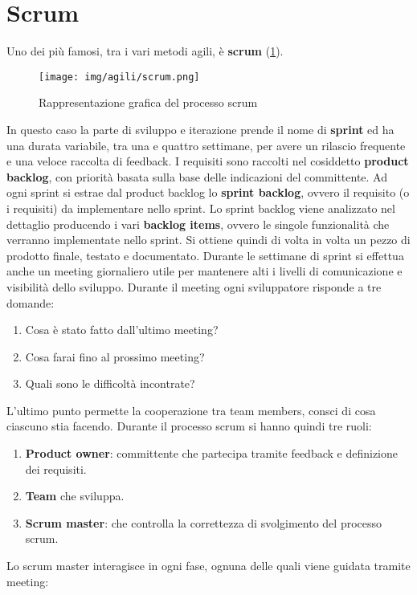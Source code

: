 \section{Scrum}
Uno dei più famosi, tra i vari metodi agili, è \textbf{scrum} (\ref{fig:scrum}).
\begin{figure}[!ht]
      \centering
      \texttt{[image: img/agili/scrum.png]}
      \caption{Rappresentazione grafica del processo scrum}
      \label{fig:scrum}
\end{figure}
In questo caso la parte di sviluppo e iterazione prende il nome di \textbf{sprint}
ed ha una durata variabile, tra una e quattro settimane, per avere un rilascio
frequente e una veloce raccolta di feedback. I requisiti sono raccolti nel cosiddetto
\textbf{product backlog}, con priorità basata sulla base delle indicazioni del
committente. Ad ogni sprint si estrae dal product backlog lo \textbf{sprint backlog},
ovvero il requisito (o i requisiti) da implementare nello sprint. Lo sprint backlog
viene analizzato nel dettaglio producendo i vari \textbf{backlog items}, ovvero
le singole funzionalità che verranno implementate nello sprint. Si ottiene quindi
di volta in volta un pezzo di prodotto finale, testato e documentato. Durante le
settimane di sprint si effettua anche un meeting giornaliero utile per mantenere
alti i livelli di comunicazione e visibilità dello sviluppo. Durante il meeting
ogni sviluppatore risponde a tre domande:
\begin{enumerate}
      \item Cosa è stato fatto dall'ultimo meeting?
      \item Cosa farai fino al prossimo meeting?
      \item Quali sono le difficoltà incontrate?
\end{enumerate}
L'ultimo punto permette la cooperazione tra team members, consci di cosa ciascuno
stia facendo. Durante il processo scrum si hanno quindi tre ruoli:
\begin{enumerate}
      \item \textbf{Product owner}: committente che partecipa tramite feedback
            e definizione dei requisiti.
      \item \textbf{Team} che sviluppa.
      \item \textbf{Scrum master}: che controlla la correttezza di svolgimento
            del processo scrum.
\end{enumerate}
Lo scrum master interagisce in ogni fase, ognuna delle quali viene guidata
tramite meeting:
